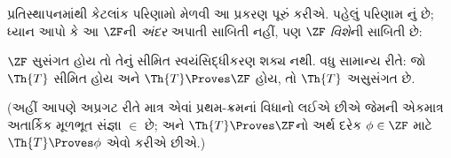 પ્રતિસ્થાપનમાંથી કેટલાંક પરિણામો મેળવી આ પ્રકરણ પૂરું
કરીએ. પહેલું પરિણામ \citet{Montague1961}નું છે; ધ્યાન
આપો કે આ $\ZF$ની \emph{અંદર} અપાતી સાબિતી નહીં,
પણ $\ZF$ \emph{વિશે}ની સાબિતી છે:
\begin{thm}
	$\ZF$ સુસંગત હોય તો તેનું સીમિત સ્વયંસિદ્ધીકરણ શક્ય નથી. વધુ સામાન્ય રીતે:
	જો $\Th{T}$ સીમિત હોય અને $\Th{T} \Proves \ZF$ હોય,
	તો $\Th{T}$ અસુસંગત છે.
	
	(અહીં આપણે અપ્રગટ રીતે માત્ર એવાં પ્રથમ-ક્રમનાં
	વિધાનો લઈએ છીએ જેમની એકમાત્ર અતાર્કિક મૂળભૂત
	સંજ્ઞા $\in$ છે; અને $\Th{T} \Proves \ZF$નો
	અર્થ દરેક $\phi \in \ZF$ માટે
	$\Th{T} \Proves \phi$ એવો કરીએ છીએ.)
\end{thm}
